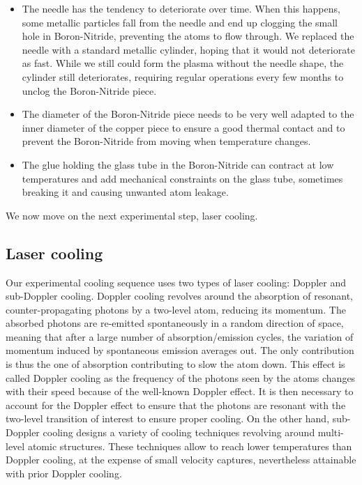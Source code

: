 \begin{itemize}
    \item The needle has the tendency to deteriorate over time. When this happens, some metallic particles fall from the needle and end up clogging the small hole in Boron-Nitride, preventing the atoms to flow through. We replaced the needle with a standard metallic cylinder, hoping that it would not deteriorate as fast. While we still could form the plasma without the needle shape, the cylinder still deteriorates, requiring regular operations every few months to unclog the Boron-Nitride piece.
    \item The diameter of the Boron-Nitride piece needs to be very well adapted to the inner diameter of the copper piece to ensure a good thermal contact and to prevent the Boron-Nitride from moving when temperature changes.
    \item The glue holding the glass tube in the Boron-Nitride can contract at low temperatures and add mechanical constraints on the glass tube, sometimes breaking it and causing unwanted atom leakage.
\end{itemize}

We now move on the next experimental step, laser cooling.


\subsection{Laser cooling}

Our experimental cooling sequence uses two types of laser cooling: Doppler and sub-Doppler cooling. Doppler cooling revolves around the absorption of resonant, counter-propagating photons by a two-level atom, reducing its momentum. The absorbed photons are re-emitted spontaneously in a random direction of space, meaning that after a large number of absorption/emission cycles, the variation of momentum induced by spontaneous emission averages out. The only contribution is thus the one of absorption contributing to slow the atom down. This effect is called Doppler cooling as the frequency of the photons seen by the atoms changes with their speed because of the well-known Doppler effect. It is then necessary to account for the Doppler effect to ensure that the photons are resonant with the two-level transition of interest to ensure proper cooling. On the other hand, sub-Doppler cooling designs a variety of cooling techniques revolving around multi-level atomic structures. These techniques allow to reach lower temperatures than Doppler cooling, at the expense of small velocity captures, nevertheless attainable with prior Doppler cooling. 

